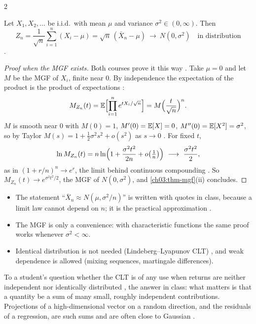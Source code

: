 \begin{paracol}{2}
\begin{theorem}\label{ch03:thm-clt}
Let $X_1,X_2,\dots$ be i.i.d.\ with mean $\mu$ and variance $\sigma^2\in(0,\infty)$. Then
\[
  Z_n=\frac{1}{\sqrt n}\sum_{i=1}^n(X_i-\mu)=\sqrt n\,(\bar X_n-\mu)\ \longrightarrow\ N(0,\sigma^2)\quad\text{in distribution}
\]
.
\end{theorem}
\begin{proof}[Proof when the MGF exists]
Both courses prove it this way . Take $\mu=0$ and let $M$ be the MGF of $X_i$, finite near $0$.
By independence the expectation of the product is the product of expectations :
\[
  M_{Z_n}(t)=\mathbb{E}\Bigl[\prod_{i=1}^ne^{tX_i/\sqrt n}\Bigr]=M\Bigl(\frac{t}{\sqrt n}\Bigr)^n .
\]
$M$ is smooth near $0$ with $M(0)=1$, $M'(0)=\mathbb{E}[X]=0$, $M''(0)=\mathbb{E}[X^2]=\sigma^2$, so by Taylor
$M(s)=1+\frac12\sigma^2s^2+o(s^2)$ as $s\to0$ . For fixed $t$,
\[
  \ln M_{Z_n}(t)=n\ln\Bigl(1+\frac{\sigma^2t^2}{2n}+o\bigl(\tfrac1n\bigr)\Bigr)\ \longrightarrow\ \frac{\sigma^2t^2}{2},
\]
as in $(1+r/n)^n\to e^r$, the limit behind continuous compounding . So $M_{Z_n}(t)\to e^{\sigma^2t^2/2}$, the MGF
of $N(0,\sigma^2)$, and \cref{ch03:thm-mgf}(ii) concludes.
\end{proof}

\begin{remark}
\leavevmode
\begin{itemize}
  \item The statement ``$\bar X_n\approx N(\mu,\sigma^2/n)$'' is written with quotes in class, because a limit law cannot
        depend on $n$; it is the practical approximation .
  \item The MGF is only a convenience: with characteristic functions the same proof works whenever $\sigma^2<\infty$.
  \item Identical distribution is not needed (Lindeberg--Lyapunov CLT) , and weak dependence is
        allowed (mixing sequences, martingale differences).
\end{itemize}
\end{remark}

To a student's question whether the CLT is of any use when returns
are neither independent nor identically distributed ,
the answer in class: what matters is that a quantity be a sum of many
small, roughly independent contributions. Projections of a
high-dimensional vector on a random direction, and the residuals of a
regression, are such sums and are often close to Gaussian
.


\end{paracol}
